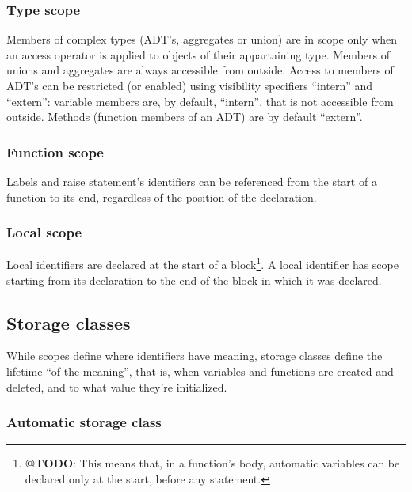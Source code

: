 \hypertarget{type-scope}{%
\subsubsection{Type scope}\label{type-scope}}

Members of complex types (ADT's, aggregates or union) are in scope only
when an access operator is applied to objects of their appartaining
type. Members of unions and aggregates are always accessible from
outside. Access to members of ADT's can be restricted (or enabled) using
visibility specifiers ``intern'' and ``extern'': variable members are,
by default, ``intern'', that is not accessible from outside. Methods
(function members of an ADT) are by default ``extern''.

\hypertarget{function-scope}{%
\subsubsection{Function scope}\label{function-scope}}

Labels and raise statement's identifiers can be referenced from the
start of a function to its end, regardless of the position of the
declaration.

\hypertarget{local-scope}{%
\subsubsection{Local scope}\label{local-scope}}

Local identifiers are declared at the start of a block\footnote{\textbf{@TODO}:
  This means that, in a function's body, automatic variables can be
  declared only at the start, before any statement.}. A local identifier
has scope starting from its declaration to the end of the block in which
it was declared.

\hypertarget{storage-classes}{%
\subsection{Storage classes}\label{storage-classes}}

While scopes define where identifiers have meaning, storage classes
define the lifetime ``of the meaning'', that is, when variables and
functions are created and deleted, and to what value they're
initialized.

\hypertarget{automatic-storage-class}{%
\subsubsection{Automatic storage class}\label{automatic-storage-class}}

